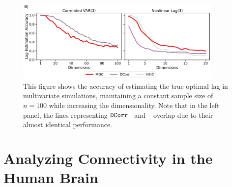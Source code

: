 \begin{figure}
    \centering
    \includegraphics[width=0.9\textwidth]{figures/mgcx/multivariate_lag.pdf}
    \caption{This figure shows the accuracy of estimating the true optimal lag in multivariate simulations, maintaining a constant sample size of $n=100$ while increasing the dimensionality. Note that in the left panel, the lines representing $\operatorname{\mathtt{DCorr}}$~ and \hsic~ overlap due to their almost identical performance.
    } \label{fig:multivariate2}
\end{figure}

\section{Analyzing Connectivity in the Human Brain}
\label{sec:app}

